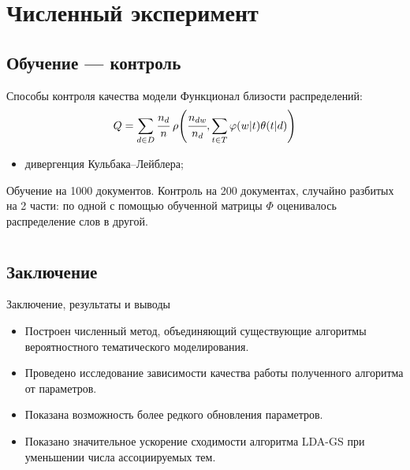 \documentclass[unicode,lefteqn,c,hyperref={pdfpagelabels=false}]{beamer}
\begin{document}
\section{Численный эксперимент}
\subsection{Обучение --- контроль}
\begin{frame}{Способы контроля качества модели}
Функционал близости распределений: $$Q = \sum\limits_{d\in D} \cfrac{n_d}n\;\rho\!\left(\cfrac{n_{dw}}{n_d}, \sum\limits_{t\in T} \varphi(w|t)\theta(t|d)\right)$$
\begin{itemize}
		\item дивергенция Кульбака–Лейблера;
\end{itemize}
Обучение на 1000 документов. Контроль на 200 документах, случайно разбитых на 2 части: по одной с помощью обученной матрицы $\Phi$ оценивалось распределение слов в другой.
\end{frame}

\section*{}
\subsection{Заключение}
\begin{frame}{Заключение, результаты и выводы}
\begin{itemize}
		\item Построен численный метод, объединяющий существующие алгоритмы вероятностного тематического моделирования.
		\item Проведено исследование зависимости качества работы полученного алгоритма от параметров.
		\item Показана возможность более редкого обновления параметров.
		\item Показано значительное ускорение сходимости алгоритма LDA-GS при уменьшении числа ассоциируемых тем.
\end{itemize}

\end{frame}
\end{document}
